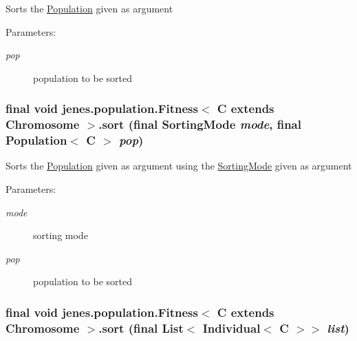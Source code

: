 Sorts the \hyperlink{}{Population} given as argument 

\begin{Desc}
\item[Parameters:]
\begin{description}
\item[{\em pop}]population to be sorted \end{description}
\end{Desc}
\hypertarget{classjenes_1_1population_1_1_fitness_3_01_c_01extends_01_chromosome_01_4_939407da23b7bfed0f12233a74690e46}{
\subsubsection[sort]{\setlength{\rightskip}{0pt plus 5cm}final void jenes.population.Fitness$<$ C extends Chromosome $>$.sort (final {\bf SortingMode} {\em mode}, \/  final Population$<$ C $>$ {\em pop})}}
\label{classjenes_1_1population_1_1_fitness_3_01_c_01extends_01_chromosome_01_4_939407da23b7bfed0f12233a74690e46}


Sorts the \hyperlink{}{Population} given as argument using the \hyperlink{}{SortingMode} given as argument 

\begin{Desc}
\item[Parameters:]
\begin{description}
\item[{\em mode}]sorting mode \item[{\em pop}]population to be sorted \end{description}
\end{Desc}
\hypertarget{classjenes_1_1population_1_1_fitness_3_01_c_01extends_01_chromosome_01_4_966f1a594a9eed5607e27222fd27e696}{
\subsubsection[sort]{\setlength{\rightskip}{0pt plus 5cm}final void jenes.population.Fitness$<$ C extends Chromosome $>$.sort (final List$<$ Individual$<$ C $>$$>$ {\em list})}}
\label{classjenes_1_1population_1_1_fitness_3_01_c_01extends_01_chromosome_01_4_966f1a594a9eed5607e27222fd27e696}


